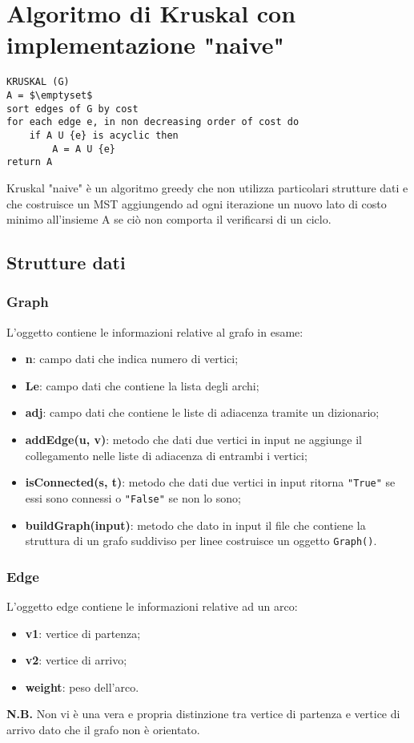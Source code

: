 \section{Algoritmo di Kruskal con implementazione "naive"}
\begin{lstlisting}[mathescape=true]
KRUSKAL (G)
A = $\emptyset$
sort edges of G by cost
for each edge e, in non decreasing order of cost do
	if A U {e} is acyclic then
		A = A U {e}
return A	
\end{lstlisting}
Kruskal "naive" è un algoritmo greedy che non utilizza particolari strutture dati e che costruisce un MST aggiungendo ad ogni iterazione un nuovo lato di costo minimo all'insieme A se ciò non comporta il verificarsi di un ciclo.
\subsection{Strutture dati}
\subsubsection{Graph}
L'oggetto contiene le informazioni relative al grafo in esame:
\begin{itemize}
	\item \textbf{n}: campo dati che indica numero di vertici;
	\item \textbf{Le}: campo dati che contiene la lista degli archi;
	\item \textbf{adj}: campo dati che contiene le liste di adiacenza tramite un dizionario;
	\item \textbf{addEdge(u, v)}: metodo che dati due vertici in input ne aggiunge il collegamento nelle liste di adiacenza di entrambi i vertici;
	\item \textbf{isConnected(s, t)}: metodo che dati due vertici in input ritorna \texttt{"True"} se essi sono connessi o \texttt{"False"} se non lo sono;
	\item \textbf{buildGraph(input)}: metodo che dato in input il file che contiene la struttura di un grafo suddiviso per linee costruisce un oggetto \texttt{Graph()}.
\end{itemize} 
\subsubsection{Edge}
L'oggetto edge contiene le informazioni relative ad un arco:
\begin{itemize}
	\item \textbf{v1}: vertice di partenza;
	\item \textbf{v2}: vertice di arrivo;
	\item \textbf{weight}: peso dell'arco.
\end{itemize}
\textbf{N.B.} Non vi è una vera e propria distinzione tra vertice di partenza e vertice di arrivo dato che il grafo non è orientato.

